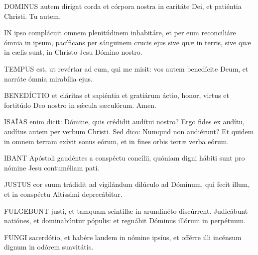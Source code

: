 \lettrine[lines=2]{D}{OMINUS} autem dírigat corda et córpora nostra in caritáte Dei, et patiéntia Christi. Tu autem.



\lettrine[lines=2]{I}{N} ipso complácuit omnem plenitúdinem inhabitáre, et per eum reconciliáre ómnia in ipsum, pacíficans per sánguinem crucis ejus sive quæ in terris, sive quæ in cælis sunt, in Christo Jesu Dómino nostro.



\lettrine[lines=2]{T}{EMPUS} est, ut revértar ad eum, qui me misit: vos autem benedícite Deum, et narráte ómnia mirabília ejus.


\lettrine[lines=2]{B}{ENEDÍCTIO} et cláritas et sapiéntia et gratiárum áctio, honor, virtus et fortitúdo Deo nostro in sǽcula sæculórum. Amen.


\lettrine[lines=2]{I}{SAÍAS} enim dicit: Dómine, quis crédidit audítui nostro? Ergo fides ex audítu, audítus autem per verbum Christi. Sed dico: Numquid non audiérunt? Et quidem in omnem terram exívit sonus eórum, et in fines orbis terræ verba eórum.



\lettrine[lines=2]{I}{BANT} Apóstoli gaudéntes a conspéctu concílii, quóniam digni hábiti sunt pro nómine Jesu contuméliam pati.


\lettrine[lines=2]{J}{USTUS} cor suum trádidit ad vigilándum dilúculo ad Dóminum, qui fecit illum, et in conspéctu Altíssimi deprecábitur.


\lettrine[lines=2]{F}{ULGEBUNT} justi, et tamquam scintíllæ in arundinéto discúrrent. Judicábunt natiónes, et dominabúntur pópulis: et regnábit Dóminus illórum in perpétuum.


\lettrine[lines=2]{F}{UNGI} sacerdótio, et habére laudem in nómine ipsíus, et offérre illi incénsum dignum in odórem suavitátis.

